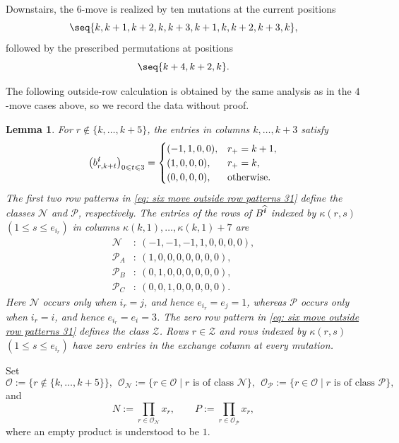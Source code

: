 \documentclass[12pt, leqno]{amsart}
\numberwithin{equation}{section}
\theoremstyle{plain}
\newtheorem{lemma}{Lemma}[section]
\theoremstyle{definition}
\renewcommand{\le}{\leqslant}
\newcommand{\seteq}{\mathbin{:=}}
\newcommand{\ii}{ \textbf{\textit{i}}}
\newcommand{\hii}{{\widehat{\ii}}}
\newcommand{\calN}{\mathcal{N}}
\newcommand{\calO}{\mathcal{O}}
\newcommand{\calP}{\mathcal{P}}
\newcommand{\calZ}{\mathcal{Z}}
\begin{document}
Downstairs, the $6$-move is realized by ten mutations at the current
positions
\[
\seq{k,k+1,k+2,k,k+3,k+1,k,k+2,k+3,k},
\]
followed by the prescribed permutations at positions
\[
\seq{k+4,k+2,k}.
\]

The following outside-row calculation is obtained by the same analysis as in the $4$-move
cases above, so we record the data without proof.

\begin{lemma}\label{lem: GLS six move outside rows 31}
For $r\notin\{k,\ldots,k+5\}$, the entries in columns $k,\ldots,k+3$ satisfy
\begin{equation}\label{eq: six move outside row patterns 31}
\bigl(b^\ii_{r,k+t}\bigr)_{0\le t\le3}=
\begin{cases}
(-1,1,0,0),&r_+=k+1,\\
(1,0,0,0),&r_+=k,\\
(0,0,0,0),&\text{otherwise}.
\end{cases}
\end{equation}
 The first two row patterns in
\eqref{eq: six move outside row patterns 31} define the classes $\calN$ and $\calP$, respectively. The entries of  the rows of $B^\hii$ indexed by $\kappa(r,s)$ $(1\le s\le e_{i_r})$
in columns $\kappa(k,1),\ldots,\kappa(k,1)+7$ 
are
\begin{equation}\label{eq: six move active row data 31}
\begin{aligned}
\calN&:\ (-1,-1,-1,1,0,0,0,0),\\
\calP_A&:\ (1,0,0,0,0,0,0,0),\\
\calP_B&:\ (0,1,0,0,0,0,0,0),\\
\calP_C&:\ (0,0,1,0,0,0,0,0).
\end{aligned}
\end{equation}
Here $\calN$ occurs only when $i_r=j$, and hence  $e_{i_r}=e_j=1$, whereas $\calP$ occurs only when $i_r=i$,
and hence  $e_{i_r}=e_i=3$.
 The zero row pattern in
\eqref{eq: six move outside row patterns 31} defines the class $\calZ$.  Rows $r\in\calZ$ and rows indexed by $\kappa(r,s)$ $(1\le s\le e_{i_r})$ have zero entries in the exchange column at every mutation. 
\end{lemma}

Set
\[
\calO\seteq\{r\notin\{k,\ldots,k+5\}\}, \ \
\calO_{\calN}\seteq \{r\in\calO\mid r\text{ is of class }\calN\},\ \
\calO_{\calP}\seteq \{r\in\calO\mid r\text{ is of class }\calP\},
\]
and
\[
N\seteq\prod_{r\in\calO_{\calN}}x_r, \qquad P\seteq\prod_{r\in\calO_{\calP}}x_r,
\]
where an empty product is understood to be $1$.
\end{document}
